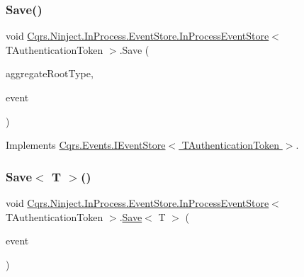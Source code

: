 \subsubsection{\texorpdfstring{Save()}{Save()}}
{\footnotesize\ttfamily void \hyperlink{classCqrs_1_1Ninject_1_1InProcess_1_1EventStore_1_1InProcessEventStore}{Cqrs.\+Ninject.\+In\+Process.\+Event\+Store.\+In\+Process\+Event\+Store}$<$ T\+Authentication\+Token $>$.Save (\begin{DoxyParamCaption}\item[{Type}]{aggregate\+Root\+Type,  }\item[{\hyperlink{interfaceCqrs_1_1Events_1_1IEvent}{I\+Event}$<$ T\+Authentication\+Token $>$ @}]{event }\end{DoxyParamCaption})}



Implements \hyperlink{interfaceCqrs_1_1Events_1_1IEventStore_a81fb586703e7c6dea6b23d9a95f3887a_a81fb586703e7c6dea6b23d9a95f3887a}{Cqrs.\+Events.\+I\+Event\+Store$<$ T\+Authentication\+Token $>$}.

\mbox{\label{classCqrs_1_1Ninject_1_1InProcess_1_1EventStore_1_1InProcessEventStore_a393924b175c56585bd4b5065d1b36f3e_a393924b175c56585bd4b5065d1b36f3e}} 
\subsubsection{\texorpdfstring{Save$<$ T $>$()}{Save< T >()}}
{\footnotesize\ttfamily void \hyperlink{classCqrs_1_1Ninject_1_1InProcess_1_1EventStore_1_1InProcessEventStore}{Cqrs.\+Ninject.\+In\+Process.\+Event\+Store.\+In\+Process\+Event\+Store}$<$ T\+Authentication\+Token $>$.\hyperlink{classCqrs_1_1Ninject_1_1InProcess_1_1EventStore_1_1InProcessEventStore_a21816423f7b71249f3dc7ce14952e1e5_a21816423f7b71249f3dc7ce14952e1e5}{Save}$<$ T $>$ (\begin{DoxyParamCaption}\item[{\hyperlink{interfaceCqrs_1_1Events_1_1IEvent}{I\+Event}$<$ T\+Authentication\+Token $>$ @}]{event }\end{DoxyParamCaption})}



